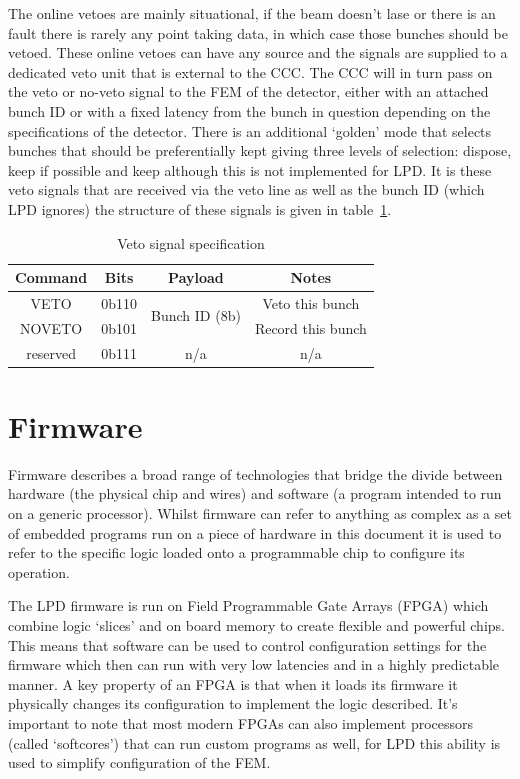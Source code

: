 The online vetoes are mainly situational, if the beam doesn't lase or there is an fault there is rarely any point taking data, in which case those bunches should be vetoed. These online vetoes can have any source and the signals are supplied to a dedicated veto unit that is external to the CCC. The CCC will in turn pass on the veto or no-veto signal to the FEM of the detector, either with an attached bunch ID or with a fixed latency from the bunch in question depending on the specifications of the detector. There is an additional `golden' mode that selects bunches that should be preferentially kept giving three levels of selection: dispose, keep if possible and keep although this is not implemented for LPD. It is these veto signals that are received via the veto line as well as the bunch ID (which LPD ignores) the structure of these signals is given in table~\ref{tab:veto_spec}.

\begin{table}
  \begin{center}
  \begin{tabular}{c|c|c|c}
    Command & Bits   & Payload                        & Notes\\
    \hline
    VETO    & 0b110  & \multirow{2}{*}{Bunch ID (8b)} & Veto this bunch \\
    NOVETO  & 0b101  &                                & Record this bunch \\
    reserved& 0b111  & n/a                            & n/a \\
  \end{tabular}
  \end{center}
  \caption{Veto signal specification}
  \label{tab:veto_spec}
\end{table}
\section{Firmware} %
\label{sec:firmware}
Firmware describes a broad range of technologies that bridge the divide between hardware (the physical chip and wires) and software (a program intended to run on a generic processor). Whilst firmware can refer to anything as complex as a set of embedded programs run on a piece of hardware in this document it is used to refer to the specific logic loaded onto a programmable chip to configure its operation.

The LPD firmware is run on Field Programmable Gate Arrays (FPGA) which combine logic `slices' and on board memory to create flexible and powerful chips. This means that software can be used to control configuration settings for the firmware which then can run with very low latencies and in a highly predictable manner. A key property of an FPGA is that when it loads its firmware it physically changes its configuration to implement the logic described. It's important to note that most modern FPGAs can also implement processors (called `softcores') that can run custom programs as well, for LPD this ability is used to simplify configuration of the FEM.

